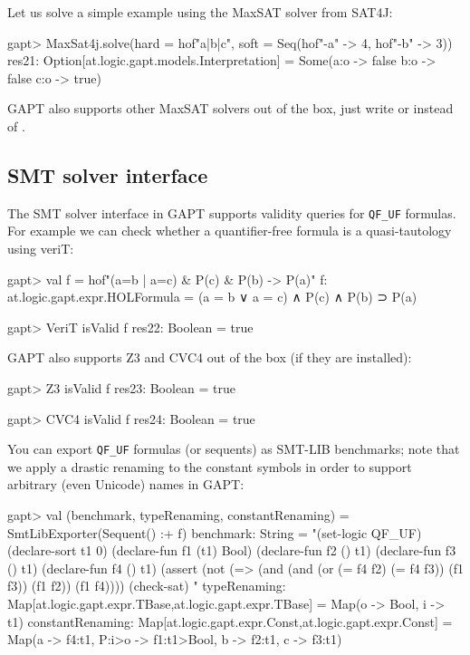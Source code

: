 \documentclass[a4paper,11pt]{article}
\newcommand{\cli}[1]{{\ttfamily {#1}}}
\begin{document}
Let us solve a simple example using the MaxSAT solver from SAT4J:

\begin{clilisting}
gapt> MaxSat4j.solve(hard = hof"a|b|c", soft = Seq(hof"-a" -> 4, hof"-b" -> 3))
res21: Option[at.logic.gapt.models.Interpretation] =
Some(a:o -> false
b:o -> false
c:o -> true)

\end{clilisting}

GAPT also supports other MaxSAT solvers out of the box, just write
\cli{OpenWBO} or \cli{ToySolver} instead of \cli{MaxSat4j}.

\subsection{SMT solver interface}

The SMT solver interface in GAPT supports validity queries for \verb,QF_UF,
formulas.  For example we can check whether a quantifier-free formula is a
quasi-tautology using veriT:
\begin{clilisting}
gapt> val f = hof"(a=b | a=c) & P(c) & P(b) -> P(a)"
f: at.logic.gapt.expr.HOLFormula = (a = b ∨ a = c) ∧ P(c) ∧ P(b) ⊃ P(a)

\end{clilisting}

\begin{clilisting}
gapt> VeriT isValid f
res22: Boolean = true

\end{clilisting}

GAPT also supports Z3 and CVC4 out of the box (if they are installed):
\begin{clilisting}
gapt> Z3 isValid f
res23: Boolean = true

gapt> CVC4 isValid f
res24: Boolean = true

\end{clilisting}

You can export \verb,QF_UF, formulas (or sequents) as SMT-LIB benchmarks;
note that we apply a drastic renaming to the constant symbols in order to
support arbitrary (even Unicode) names in GAPT:
\begin{clilisting}
gapt> val (benchmark, typeRenaming, constantRenaming) = SmtLibExporter(Sequent() :+ f)
benchmark: String =
"(set-logic QF_UF)
(declare-sort t1 0)
(declare-fun f1 (t1) Bool)
(declare-fun f2 () t1)
(declare-fun f3 () t1)
(declare-fun f4 () t1)
(assert (not (=> (and (and (or (= f4 f2) (= f4 f3)) (f1 f3)) (f1 f2)) (f1 f4))))
(check-sat)
"
typeRenaming: Map[at.logic.gapt.expr.TBase,at.logic.gapt.expr.TBase] = Map(o -> Bool, i -> t1)
constantRenaming: Map[at.logic.gapt.expr.Const,at.logic.gapt.expr.Const] = Map(a -> f4:t1, P:i>o -> f1:t1>Bool, b -> f2:t1, c -> f3:t1)

\end{clilisting}
\end{document}
